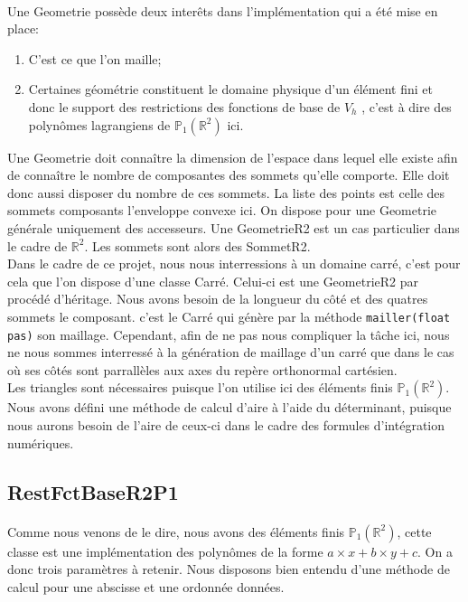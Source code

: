 \paragraph{} Une Geometrie possède deux interêts dans l'implémentation qui a été mise en place:
\begin{enumerate}
\item C'est ce que l'on maille;
\item Certaines géométrie constituent le domaine physique d'un élément fini et donc le support des restrictions des fonctions de base de $V_h$ , c'est à dire des polynômes lagrangiens de $\mathbb{P}_1(\mathbb{R}^2)$ ici.
\end{enumerate} 

Une Geometrie doit connaître la dimension de l'espace dans lequel elle existe afin de connaître le nombre de composantes des sommets qu'elle comporte. Elle doit donc aussi disposer du nombre de ces sommets. La liste des points est celle des sommets composants l'enveloppe convexe ici. On dispose pour une Geometrie générale uniquement des accesseurs. Une GeometrieR2 est un cas particulier dans le cadre de $\mathbb{R}^2$. Les sommets sont alors des SommetR2.\\

Dans le cadre de ce projet, nous nous interressions à un domaine carré, c'est pour cela que l'on dispose d'une classe Carré. Celui-ci est une GeometrieR2 par procédé d'héritage. Nous avons besoin de la longueur du côté et des quatres sommets le composant. c'est le Carré qui génère par la méthode \texttt{mailler(float pas)} son maillage. Cependant, afin de ne pas nous compliquer la tâche ici, nous ne nous sommes interressé à la génération de maillage d'un carré que dans le cas où ses côtés sont parrallèles aux axes du repère orthonormal cartésien.\\

Les triangles sont nécessaires puisque l'on utilise ici des éléments finis $\mathbb{P}_1(\mathbb{R}^2)$. Nous avons défini une méthode de calcul d'aire à l'aide du déterminant, puisque nous aurons besoin de l'aire de ceux-ci dans le cadre des formules d'intégration numériques.\\

\subsection{RestFctBaseR2P1}
\paragraph{} Comme nous venons de le dire, nous avons des éléments finis $\mathbb{P}_1(\mathbb{R}^2)$, cette classe est une implémentation des polynômes de la forme $a\times x + b\times y + c$. On a donc trois paramètres à retenir. Nous disposons bien entendu d'une méthode de calcul pour une abscisse et une ordonnée données.\\

